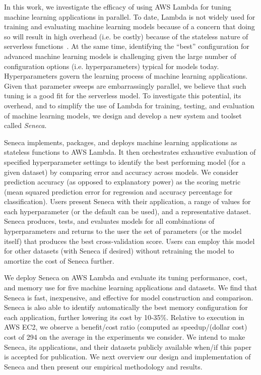 In this work, we investigate the efficacy of using AWS Lambda
for tuning machine learning applications in parallel.
To date, Lambda is not widely used for training and evaluating
machine learning models because of a concern that 
doing so will result in high overhead (i.e. be costly) because
of the stateless nature of serverless functions~\cite{ref:onesteptwostep}.
At the same time, identifying the ``best'' configuration for advanced
machine learning models is challenging given the large number of configuration
options (i.e. hyperparameters) typical for models today.
Hyperparameters govern the learning process of machine learning applications.
Given that parameter sweeps are embarrassingly parallel, we believe
that such tuning is a good fit for the serverless model.
To investigate this potential, its overhead, and to simplify the 
use of Lambda for training, testing, and evaluation of machine learning models, 
we design and develop a new system and toolset called \textit{Seneca}.

Seneca implements, packages, and deploys 
machine learning applications as stateless functions to AWS Lambda.
It then orchestrates exhaustive evaluation of specified hyperparameter settings
to identify the best performing model (for a given dataset) by
comparing error and accuracy across models.  We consider
prediction accuracy (as opposed to explanatory power) as the
scoring metric (mean squared prediction error for regression 
and accuracy percentage for classification).
Users present Seneca with their application, a range of values for 
each hyperparameter (or the default can be used), and a representative dataset.
Seneca produces, tests, and evaluates models for all combinations 
of hyperparameters and returns to the user
the set of parameters (or the model itself) that produces
the best cross-validation score.
Users can employ this model for other datasets
(with Seneca if desired) without retraining the model to amortize the cost of Seneca further.

We deploy Seneca on AWS Lambda and evaluate its tuning performance, cost,
and memory use for five machine learning applications and datasets. We 
find that Seneca is fast, inexpensive, and effective for model 
construction and comparison. Seneca is also able to identify
automatically the
best memory configuration for each application, further lowering its
cost
by 10-35\%. Relative to execution in AWS EC2, we observe a benefit/cost
ratio (computed as speedup/(dollar cost) cost of 294 on the average
in the experiments we consider.
We intend to make Seneca, its applications, and their datasets publicly available
when/if this paper is accepted for publication.  
We next overview our design and implementation of Seneca and then
present our empirical methodology and results.
